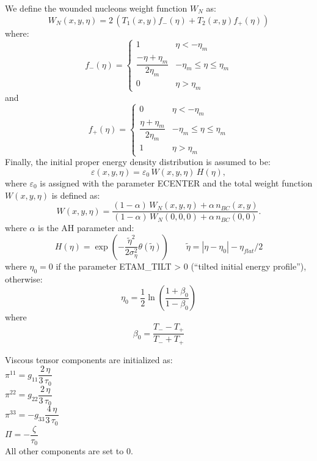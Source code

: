We define the wounded nucleons weight function $W_N$ as:
\begin{displaymath}
 W_N(x,y,\eta)=2\,\left( T_1(x,y)f_{-}(\eta)+T_2(x,y)f_{+}(\eta)\right)
\end{displaymath}
where:
$$
f_{-}(\eta)=
\begin{cases}
1 & \eta < -\eta_m\\
\dfrac{-\eta+\eta_m}{2\eta_m} & -\eta_m \le \eta \le \eta_m\\
0 & \eta > \eta_m
\end{cases}
$$
and
$$
f_{+}(\eta)=
\begin{cases}
0 & \eta < -\eta_m\\
\dfrac{\eta+\eta_m}{2\eta_m} & -\eta_m \le \eta \le \eta_m\\
1 & \eta > \eta_m
\end{cases}
$$
Finally, the initial proper energy density distribution is assumed to be:
\begin{displaymath}
 \varepsilon(x,y,\eta)=\varepsilon_0 \,W(x,y,\eta)\,H(\eta),
\end{displaymath}
%
where $\varepsilon_0$ is assigned with the parameter ECENTER and the total weight function $W(x,y,\eta)$ is defined as:
%
\begin{displaymath}\label{eq:energy-glauber}
W(x,y,\eta)=\dfrac{(1-\alpha)\,W_{N}(x,y,\eta)+\alpha\,n_{BC}(x,y)}{(1-\alpha)
\,W_{N}(0,0,0)+\alpha\,n_{BC}(0,0)}.
\end{displaymath}
%
where $\alpha$ is the AH parameter and: 
%
\begin{displaymath}\label{eq:Heta}
  H(\eta)=\exp\left(-\dfrac{\tilde\eta^2}{2\sigma_{\eta}^2}\theta(\tilde \eta)\right)
  \qquad  \tilde\eta=|\eta-\eta_0|-\eta_{flat}/2
\end{displaymath}
where $\eta_0=0$ if the parameter ETAM\_TILT > 0 (``tilted initial energy profile''), otherwise:
\begin{displaymath}
\eta_0=\dfrac{1}{2}\ln \left( \dfrac{1+\beta_0}{1-\beta_0} \right)
\end{displaymath}
where
\begin{displaymath}
\beta_0=\dfrac{T_--T_+}{T_-+T_+}
\end{displaymath}

Viscous tensor components are initialized as:\\
$\pi^{11}=g_{11}\dfrac{2\, \eta}{3\, \tau_0}$\\
$\pi^{22}=g_{22}\dfrac{2\, \eta}{3\, \tau_0}$\\
$\pi^{33}=-g_{33}\dfrac{4\, \eta}{3\, \tau_0}$\\
$\Pi=-\dfrac{\zeta}{\tau_0}$\\
All other components are set to 0.


